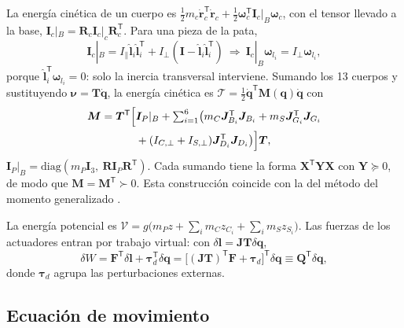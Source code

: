 \documentclass[conference]{IEEEtran}
\newcommand{\vect}[1]{\bm{#1}}
\newcommand{\T}{^{\mathsf{T}}}
\begin{document}
La energía cinética de un cuerpo es $\frac12m_c\dot{\vect r}_c\T\dot{\vect r}_c + \frac12\vect\omega_c\T\vect I_c|_B\vect\omega_c$, con el tensor llevado a la base, $\vect I_c|_B = \vect R_c\vect I_c|_c\vect R_c\T$. Para una pieza de la pata,
\begin{equation}
\vect I_c|_B = I_\parallel\hat{\vect l}_i\hat{\vect l}_i\T + I_\perp(\vect I - \hat{\vect l}_i\hat{\vect l}_i\T)\ \Rightarrow\ \vect I_c|_B\vect\omega_{l_i} = I_\perp\vect\omega_{l_i},
\end{equation}
porque $\hat{\vect l}_i\T\vect\omega_{l_i} = 0$: solo la inercia transversal interviene. Sumando los 13 cuerpos y sustituyendo $\vect\nu = \vect T\dot{\vect q}$, la energía cinética es $\mathcal T = \frac12\dot{\vect q}\T\vect M(\vect q)\dot{\vect q}$ con
\begin{equation}
\begin{split}
\vect M = \vect T\T\Bigl[&\vect I_P|_B + \textstyle\sum_{i=1}^6\bigl(m_C\vect J_{B_i}\T\vect J_{B_i} + m_S\vect J_{G_i}\T\vect J_{G_i}\\
&+ (I_{C,\perp} + I_{S,\perp})\vect J_{D_i}\T\vect J_{D_i}\bigr)\Bigr]\vect T,
\end{split}
\label{eq:M}
\end{equation}
$\vect I_P|_B = \mathrm{diag}(m_P\vect I_3,\ \vect R\vect I_P\vect R\T)$. Cada sumando tiene la forma $\vect X\T\vect Y\vect X$ con $\vect Y \succeq 0$, de modo que $\vect M = \vect M\T \succ 0$. Esta construcción coincide con la del método del momento generalizado \cite{lopes2009}.

La energía potencial es $\mathcal V = g\bigl(m_Pz + \sum_im_Cz_{C_i} + \sum_im_Sz_{S_i}\bigr)$. Las fuerzas de los actuadores entran por trabajo virtual: con $\delta\vect l = \vect J\vect T\delta\vect q$,
\begin{equation}
\delta W = \vect F\T\delta\vect l + \vect\tau_d\T\delta\vect q = \bigl[(\vect J\vect T)\T\vect F + \vect\tau_d\bigr]\T\delta\vect q \equiv \vect Q\T\delta\vect q ,
\end{equation}
donde $\vect\tau_d$ agrupa las perturbaciones externas.

\subsection{Ecuación de movimiento}
\end{document}
